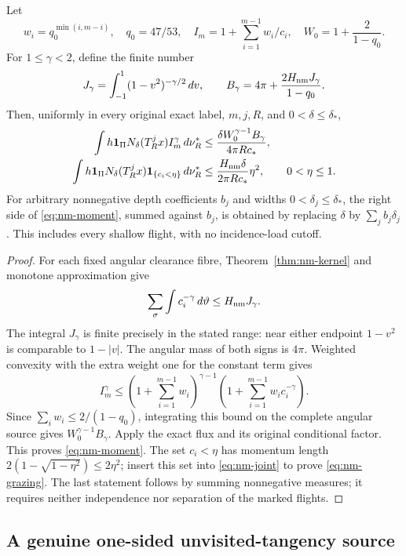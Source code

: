 \begin{corollary}
\label{cor:nm-moments}
Let
\[
 w_i=q_0^{\min(i,m-i)},\quad q_0=47/53,\quad
 I_m=1+\sum_{i=1}^{m-1} w_i/c_i,\quad
 W_0=1+\frac{2}{1-q_0}.
\]
For $1\le\gamma<2$, define the finite number
\[
 J_\gamma=\int_{-1}^1(1-v^2)^{-\gamma/2}\,dv,
 \qquad
 B_\gamma=4\pi+\frac{2H_{\rm nm}J_\gamma}{1-q_0}.
\]
Then, uniformly in every original exact label, $m,j,R$, and
$0<\delta\le\delta_*$,
\begin{align}
 \int h\mathbf1_\Pi N_\delta(T_R^jx)I_m^\gamma\,d\nu_R^*
  &\le\frac{\delta W_0^{\gamma-1}B_\gamma}{4\pi R c_*},
                                             \label{eq:nm-moment}\\
 \int h\mathbf1_\Pi N_\delta(T_R^jx)
                         \mathbf1_{\{c_i<\eta\}}\,d\nu_R^*
  &\le\frac{H_{\rm nm}\delta}{2\pi R c_*}\eta^2,
       \qquad 0<\eta\le1.                  \label{eq:nm-grazing}
\end{align}
For arbitrary nonnegative depth coefficients $b_j$ and widths
$0<\delta_j\le\delta_*$, the right side of
\eqref{eq:nm-moment}, summed against $b_j$, is obtained by
replacing $\delta$ by $\sum_j b_j\delta_j$.
This includes every shallow flight, with no incidence-load cutoff.
\end{corollary}
\begin{proof}
For each fixed angular clearance fibre, Theorem~\ref{thm:nm-kernel}
and monotone approximation give
\[
 \sum_\sigma\int c_i^{-\gamma}\,d\vartheta
                        \le H_{\rm nm}J_\gamma.
\]
The integral $J_\gamma$ is finite precisely in the stated range:
near either endpoint $1-v^2$ is comparable to $1-|v|$.
The angular mass of both signs is $4\pi$.  Weighted convexity
with the extra weight one for the constant term gives
\[
 I_m^\gamma\le
 \left(1+\sum_{i=1}^{m-1}w_i\right)^{\gamma-1}
                 \left(1+\sum_{i=1}^{m-1}w_ic_i^{-\gamma}\right).
\]
Since $\sum_iw_i\le2/(1-q_0)$, integrating this bound on the
complete angular source gives $W_0^{\gamma-1}B_\gamma$.
Apply the exact flux and its original conditional factor.  This
proves \eqref{eq:nm-moment}.  The set $c_i<\eta$ has momentum
length $2(1-\sqrt{1-\eta^2})\le2\eta^2$; insert this set into
\eqref{eq:nm-joint} to prove \eqref{eq:nm-grazing}.
The last statement follows by summing nonnegative measures; it
requires neither independence nor separation of the marked flights.
\end{proof}

\subsection{A genuine one-sided unvisited-tangency source}

